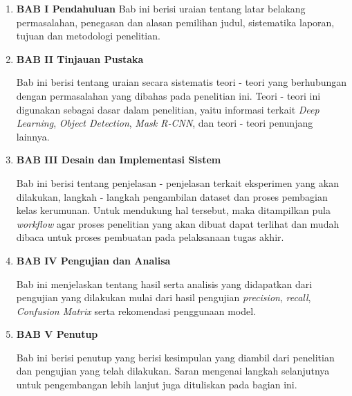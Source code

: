 \begin{enumerate}[topsep=0em]

      \item \textbf{BAB I Pendahuluan}
            Bab ini berisi uraian tentang latar belakang permasalahan, penegasan
            dan alasan pemilihan judul, sistematika laporan, tujuan dan metodologi penelitian.
      \item \textbf{BAB II Tinjauan Pustaka}

            Bab ini berisi tentang uraian secara sistematis teori - teori yang
            berhubungan dengan permasalahan yang dibahas pada penelitian ini.
            Teori - teori ini digunakan sebagai dasar dalam penelitian, yaitu informasi terkait
            \textit{Deep Learning}, \textit{Object Detection},
            \textit{Mask R-CNN}, dan teori - teori penunjang lainnya.

      \item \textbf{BAB III Desain dan Implementasi Sistem}

            Bab ini berisi tentang penjelasan - penjelasan terkait eksperimen yang akan dilakukan,
            langkah - langkah pengambilan dataset dan proses pembagian kelas kerumunan.
            Untuk mendukung hal tersebut, maka ditampilkan pula \textit{workflow} agar proses penelitian
            yang akan dibuat dapat terlihat dan mudah dibaca untuk proses pembuatan pada pelaksanaan tugas akhir.

      \item \textbf{BAB IV Pengujian dan Analisa}

            Bab ini menjelaskan tentang hasil serta analisis yang didapatkan dari pengujian yang
            dilakukan mulai dari hasil pengujian \textit{precision}, \textit{recall}, \textit{Confusion Matrix}
            serta rekomendasi penggunaan model.

      \item \textbf{BAB V Penutup}

            Bab ini berisi penutup yang berisi kesimpulan yang diambil dari penelitian dan
            pengujian yang telah dilakukan. Saran mengenai langkah selanjutnya untuk pengembangan
            lebih lanjut juga dituliskan pada bagian ini.

\end{enumerate}